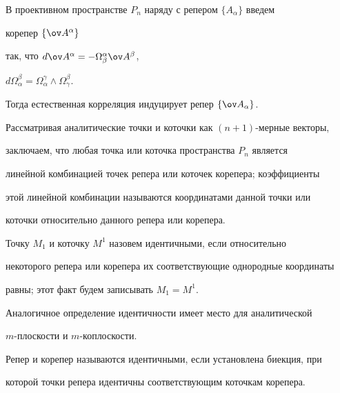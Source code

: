  


В проективном пространстве $P_n$ наряду с репером $\{A_\alpha\}$ введем 


корепер $\{\ov A^\alpha\}$ 


так, что $d\ov A^\alpha=-\Omega^\alpha_\beta\ov A^\beta$, 


$d\Omega^\beta_\alpha=\Omega^\gamma_\alpha\wedge\Omega^\beta_\gamma$. 


Тогда естественная корреляция индуцирует репер $\{\ov A_\alpha\}$. 


 


Рассматривая аналитические точки и коточки как $(n+1)$-мерные векторы, 


заключаем, что любая точка или коточка пространства $P_n$ является 


линейной комбинацией точек репера или коточек корепера; коэффициенты 


этой линейной комбинации называются координатами данной точки или 


коточки относительно данного репера или корепера. 


 


\begin{defn} 


Точку $M_1$ и коточку $M^1$ назовем идентичными, если относительно 


некоторого репера или корепера их соответствующие однородные координаты 


равны; этот факт будем записывать $M_1=M^1$. 


\end{defn} 


 


Аналогичное определение идентичности имеет место для аналитической 


$m$-плоскости и $m$-коплоскости. 


 


\begin{defn} 


Репер и корепер называются идентичными, если установлена биекция, при 


которой точки репера идентичны соответствующим коточкам корепера. 


\end{defn} 


 


